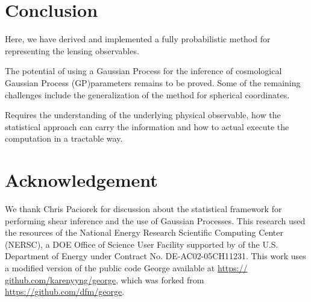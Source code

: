 

\section{Conclusion}
Here, we have derived and implemented a fully probabilistic method for 
representing the lensing observables.   

The potential of using a Gaussian Process for the inference of cosmological 
Gaussian Process (GP)parameters remains to be proved. 
Some of the remaining challenges include the generalization of the method for spherical
coordinates. 


Requires the understanding of the underlying physical observable, how the statistical
approach can carry the information and how to actual execute the computation in
a tractable way.


\section{Acknowledgement}
We thank Chris Paciorek for discussion about the statistical
framework for performing shear inference and the
use of Gaussian Processes.
This research
used the resources of the National Energy Research Scientific 
Computing Center (NERSC), a DOE Office of Science
User Facility supported by 
of the U.S. Department of Energy under Contract No.
DE-AC02-05CH11231.
 This work uses a modified version
of the public code {\sc George} available at \href{https://
github.com/karenyyng/george}{https://
github.com/karenyyng/george}, which was forked from \\
\href{https://github.com/dfm/george}{https://github.com/dfm/george}.



